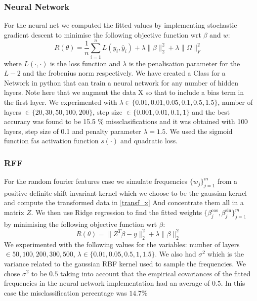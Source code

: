 \documentclass{article} %
\begin{document}
\subsubsection{Neural Network}
For the neural net we computed the fitted values by implementing stochastic gradient descent to minimise the following objective function wrt $\beta$ and $w$:
 $$ R(\theta) = \frac{1}{n} \sum_{i=1}^{n}L(y_{i}, \hat{y}_{i}) + \lambda \| \beta \|^2 _{2} + \lambda \| \Omega \|^2_{F}$$
 where $L(\cdot,\cdot)$ is the loss function and $\lambda$ is the penalisation parameter for the $L-2$ and the frobenius norm respectively. 
 We have created a Class for a Network in python that can train a neural network for any number of hidden layers. Note here that we augment the data X so that to include a bias term in the first layer.
 We experimented with $\lambda \in \{ 0.01, 0.01, 0.05, 0.1, 0.5, 1.5\} $,  number of layers $\in \{ 20, 30, 50,  100, 200\} $, step size $ \in \{ 0.001, 0.01, 0.1, 1\}$ and the best accuracy was found to be 15.5 $\%$ missclasifications and it was obtained with 100 layers, step size of 0.1 and penalty parameter $\lambda = 1.5$. We used the sigmoid function fas activation function $s( \cdot )$ and quadratic loss. 

\subsubsection{RFF}
For the random fourier features case we simulate frequencies
 $ \{ w_{j} \}_{j=1}^{m}$ from a positive definite shift invariant kernel which we choose to be the gaussian kernel and compute the transformed 
data in 
\eqref{transf_x} 
And concentrate them all in a matrix $Z$.
We then use Ridge regression to find the fitted weights $\{ \beta_{j}^{\cos}, \beta_{j}^{\sin}\}_{j=1}^{m}$
by minimising the following objective function wrt 
$\beta$:
 $$ R(\theta) = \| Z^{T} \beta - y\|^2_{2} + \lambda \| \beta\|^2 _{2} $$
We experimented with the following values for the variables: number of layers $\in { 50,100,200,300,500}$, $\lambda \in \{ 0.01, 0.05, 0.5, 1, 1.5\}$. We also had  $\sigma^2$ which is the variance related to the gaussian RBF kernel used to sample the frequencies. We chose  $\sigma^2$ to be $0.5$ taking into account that the empirical covariances of the fitted frequencies in the neural network implementation had an average of $0.5.$ In this case the misclassification percentage was $14.7 \%$
\end{document}
